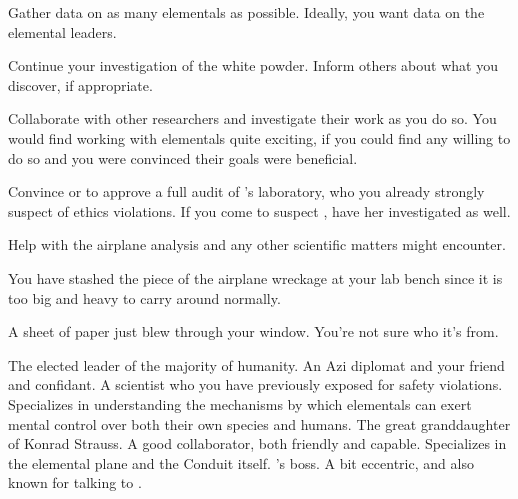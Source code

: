 \documentclass[char]{elementals}
\begin{document}
\begin{itemz}[Goals]
  \item Gather data on as many elementals as possible. Ideally, you want data on the elemental leaders.
  \item Continue your investigation of the white powder. Inform others about what you discover, if appropriate.
  \item Collaborate with other researchers and investigate their work as you do so. You would find working with elementals quite exciting, if you could find any willing to do so and you were convinced their goals were beneficial.
  \item Convince \cLeader{} or \cDema{} to approve a full audit of \cMS{}'s laboratory, who you already strongly suspect of ethics violations. If you come to suspect \cGD{}, have her investigated as well.
  \item Help \cDiplomat{} with the airplane analysis and any other scientific matters \cDiplomat{\they} might encounter.
\end{itemz}

\begin{itemz}[Notes]
\item You have stashed the piece of the airplane wreckage at your lab bench since it is too big and heavy to carry around normally.
\item A sheet of paper just blew through your window. You're not sure who it's from.
\end{itemz}

\begin{contacts}
  \contact{\cLeader{}} The elected leader of the majority of humanity.
	\contact{\cDiplomat{}} An Azi diplomat and your friend and confidant.
	\contact{\cMS{}} A scientist who you have previously exposed for safety violations. Specializes in understanding the mechanisms by which elementals can exert mental control over both their own species and humans.
	\contact{\cGD{}} The great granddaughter of Konrad Strauss. A good collaborator, both friendly and capable. Specializes in the elemental plane and the Conduit itself.
  \contact{\cAvatar{}} \cDiplomat{}'s boss. A bit eccentric, and also known for talking to \cAvatar{\themself}.
\end{contacts}
\end{document}
